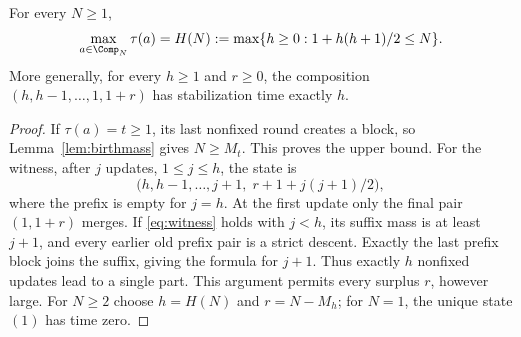 \begin{theorem}\label{thm:clock}
For every $N\ge1$,
\[
 \max_{a\in\Comp_N}\tau(a)
 = H(N):=\max\{h\ge0:1+h(h+1)/2\le N\}.
\]
More generally, for every $h\ge1$ and $r\ge0$, the composition
$(h,h-1,\ldots,1,1+r)$ has stabilization time exactly $h$.
\end{theorem}
\begin{proof}
If $\tau(a)=t\ge1$, its last nonfixed round creates a block, so
Lemma~\ref{lem:birthmass} gives $N\ge M_t$. This proves the upper bound.
For the witness, after $j$ updates, $1\le j\le h$, the state is
\begin{equation}\label{eq:witness}
 \bigl(h,h-1,\ldots,j+1,\;r+1+j(j+1)/2\bigr),
\end{equation}
where the prefix is empty for $j=h$. At the first update only the final
pair $(1,1+r)$ merges. If \eqref{eq:witness} holds with $j<h$, its suffix
mass is at least $j+1$, and every earlier old prefix pair is a strict
descent. Exactly the last prefix block joins the suffix, giving the formula
for $j+1$. Thus exactly $h$ nonfixed updates lead to a single part. This
argument permits every surplus $r$, however large. For $N\ge2$ choose
$h=H(N)$ and $r=N-M_h$; for $N=1$, the unique state $(1)$ has time zero.
\end{proof}
